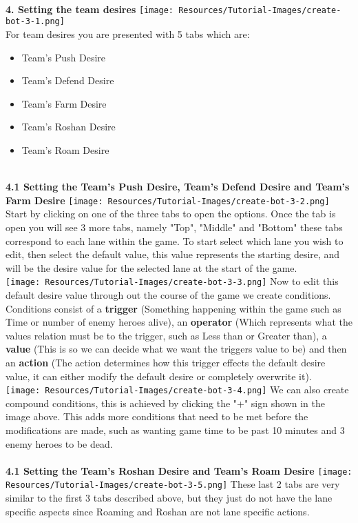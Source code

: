 \documentclass{article}
\begin{document}
\begin{flushleft}
\textbf{\\4. Setting the team desires}
\texttt{[image: Resources/Tutorial-Images/create-bot-3-1.png]}
\\For team desires you are presented with 5 tabs which are:
\begin{itemize}
	\item Team's Push Desire
	\item Team's Defend Desire
	\item Team's Farm Desire
	\item Team's Roshan Desire
	\item Team's Roam Desire
\end{itemize}
\textbf{\\4.1 Setting the Team's Push Desire, Team's Defend Desire and Team's Farm Desire}
\texttt{[image: Resources/Tutorial-Images/create-bot-3-2.png]}
Start by clicking on one of the three tabs to open the options. Once the tab is open you will see 3 more tabs, namely "Top", "Middle" and "Bottom" these tabs correspond to each lane within the game. To start select which lane you wish to edit, then select the default value, this value represents the starting desire, and will be the desire value for the selected lane at the start of the game.\\
\texttt{[image: Resources/Tutorial-Images/create-bot-3-3.png]}
Now to edit this default desire value through out the course of the game we create conditions. Conditions consist of a \textbf{trigger} (Something happening within the game such as Time or number of enemy heroes alive), an \textbf{operator} (Which represents what the values relation must be to the trigger, such as Less than or Greater than), a \textbf{value} (This is so we can decide what we want the triggers value to be) and then an \textbf{action} (The action determines how this trigger effects the default desire value, it can either modify the default desire or completely overwrite it).\\
\texttt{[image: Resources/Tutorial-Images/create-bot-3-4.png]}
We can also create compound conditions, this is achieved by clicking the "+" sign shown in the image above. This adds more conditions that need to be met before the modifications are made, such as wanting game time to be past 10 minutes and 3 enemy heroes to be dead.\\
\textbf{\\4.1 Setting the Team's Roshan Desire and Team's Roam Desire}
\texttt{[image: Resources/Tutorial-Images/create-bot-3-5.png]}
These last 2 tabs are very similar to the first 3 tabs described above, but they just do not have the lane specific aspects since Roaming and Roshan are not lane specific actions.


\end{flushleft}
\end{document}
